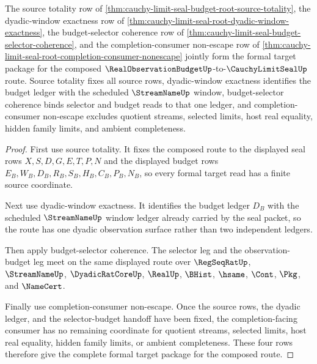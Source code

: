 \begin{theorem}
\label{thm:cauchy-limit-seal-root-formal-target-package}
The source totality row of \autoref{thm:cauchy-limit-seal-budget-root-source-totality}, the dyadic-window exactness row of \autoref{thm:cauchy-limit-seal-root-dyadic-window-exactness}, the budget-selector coherence row of \autoref{thm:cauchy-limit-seal-budget-selector-coherence}, and the completion-consumer non-escape row of \autoref{thm:cauchy-limit-seal-root-completion-consumer-nonescape} jointly form the formal target package for the composed $\RealObservationBudgetUp$-to-$\CauchyLimitSealUp$ route. Source totality fixes all source rows, dyadic-window exactness identifies the budget ledger with the scheduled $\StreamNameUp$ window, budget-selector coherence binds selector and budget reads to that one ledger, and completion-consumer non-escape excludes quotient streams, selected limits, host real equality, hidden family limits, and ambient completeness.
\end{theorem}
\begin{proof}
First use source totality. It fixes the composed route to the displayed seal rows $X,S,D,G,E,T,P,N$ and the displayed budget rows $E_B,W_B,D_B,R_B,S_B,H_B,C_B,P_B,N_B$, so every formal target read has a finite source coordinate.

Next use dyadic-window exactness. It identifies the budget ledger $D_B$ with the scheduled $\StreamNameUp$ window ledger already carried by the seal packet, so the route has one dyadic observation surface rather than two independent ledgers.

Then apply budget-selector coherence. The selector leg and the observation-budget leg meet on the same displayed route over $\RegSeqRatUp$, $\StreamNameUp$, $\DyadicRatCoreUp$, $\RealUp$, $\BHist$, $\hsame$, $\Cont$, $\Pkg$, and $\NameCert$.

Finally use completion-consumer non-escape. Once the source rows, the dyadic ledger, and the selector-budget handoff have been fixed, the completion-facing consumer has no remaining coordinate for quotient streams, selected limits, host real equality, hidden family limits, or ambient completeness. These four rows therefore give the complete formal target package for the composed route.
\end{proof}

